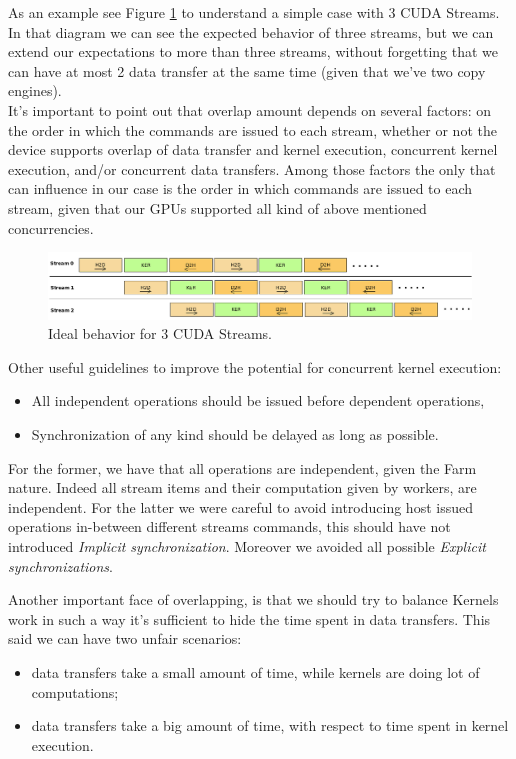 	As an example see Figure \ref{fig:threeStreams} to understand a simple case with 3 CUDA Streams.
	In that diagram we can see the expected behavior  of three streams, but we can extend our expectations to more than three streams, without forgetting that we can have at most 2 data transfer at the same time (given that we've two copy engines).\\
	
	It's important to point out that overlap amount depends on several factors: on the order in which the commands are issued to each stream, whether or not the device supports overlap of data transfer and kernel execution, concurrent kernel execution, and/or concurrent data transfers. Among those factors the only that can influence in our case is the order in which commands are issued to each stream, given that our GPUs supported all kind of above mentioned concurrencies.

	
	
	
	\begin{figure}
		\includegraphics[width=\linewidth]{images/3Streams.png}
		\caption{Ideal behavior for 3 CUDA Streams.}
		\label{fig:threeStreams}
	\end{figure}
	
	Other useful guidelines to improve the potential for concurrent kernel execution:
	\begin{itemize}
		\item All independent operations should be issued before dependent operations,
		\item Synchronization of any kind should be delayed as long as possible.
	\end{itemize}

	For the former, we have that all operations are independent, given the Farm nature. Indeed all stream items and their computation given by workers, are independent.
	For the latter we were careful to avoid introducing host issued operations in-between different streams commands, this should have not introduced 
	\textit{Implicit synchronization}.
	Moreover we avoided all possible \textit{Explicit synchronizations}.
	
	Another important face of overlapping, is that we should try to balance Kernels work in such a way it's sufficient to hide the time spent in data transfers. 
	This said we can have two unfair scenarios:
	\begin{itemize}
		\item data transfers take a small amount of time, while kernels are doing lot of computations;
		\item data transfers take a big amount of time, with respect to time spent in kernel execution.
	\end{itemize}
	
